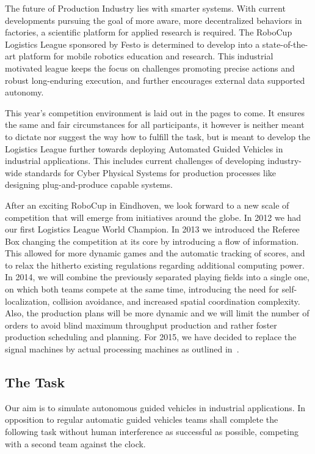 \documentclass[12pt,twoside]{article}
\begin{document}
The future of Production Industry lies with smarter systems.  With
current developments pursuing the goal of more aware, more
decentralized behaviors in factories, a scientific platform for
applied research is required.  The RoboCup Logistics League sponsored
by Festo is determined to develop into a state-of-the-art platform for
mobile robotics education and research. This industrial motivated
league keeps the focus on challenges promoting precise actions and
robust long-enduring execution, and further encourages external data
supported autonomy.

This year's competition environment is laid out in the pages to come.
It ensures the same and fair circumstances for all participants, it
however is neither meant to dictate nor suggest the way how to fulfill
the task, but is meant to develop the Logistics League further towards
deploying Automated Guided Vehicles in industrial applications. This
includes current challenges of developing industry-wide standards for
Cyber Physical Systems for production processes like designing
plug-and-produce capable systems.

After an exciting RoboCup in Eindhoven, we look forward to a new scale
of competition that will emerge from initiatives around the globe. In
2012 we had our first Logistics League World Champion.  In 2013 we
introduced the Referee Box changing the competition at its core by
introducing a flow of information.  This allowed for more dynamic
games and the automatic tracking of scores, and to relax the hitherto
existing regulations regarding additional computing power. In 2014, we
will combine the previously separated playing fields into a single
one, on which both teams compete at the same time, introducing the
need for self-localization, collision avoidance, and increased spatial
coordination complexity. Also, the production plans will be more
dynamic and we will limit the number of orders to avoid blind maximum
throughput production and rather foster production scheduling and
planning. For 2015, we have decided to replace the signal machines by
actual processing machines as outlined in~\cite{wdrl2013}.

\subsection{The Task}
\label{sec:task}

Our aim is to simulate autonomous guided vehicles in industrial
applications. In opposition to regular automatic guided vehicles teams
shall complete the following task without human interference as
successful as possible, competing with a second team against the
clock.
\end{document}
